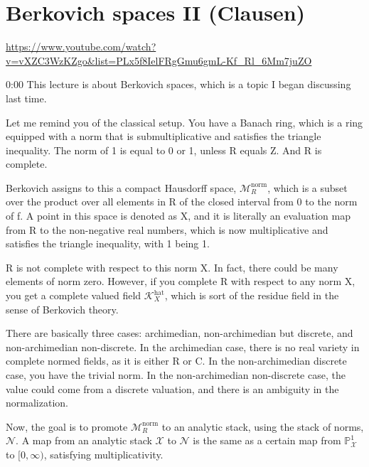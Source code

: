 
\section{\ufs Berkovich spaces II (Clausen)}

\url{https://www.youtube.com/watch?v=vXZC3WzKZgo&list=PLx5f8IelFRgGmu6gmL-Kf_Rl_6Mm7juZO}
\renewcommand{\yt}[2]{\href{https://www.youtube.com/watch?v=vXZC3WzKZgo&list=PLx5f8IelFRgGmu6gmL-Kf_Rl_6Mm7juZO&t=#1}{#2}}
\vspace{1em}

\begin{unfinished}{0:00}
This lecture is about Berkovich spaces, which is a topic I began discussing last time.

Let me remind you of the classical setup. You have a Banach ring, which is a ring equipped with a norm that is submultiplicative and satisfies the triangle inequality. The norm of 1 is equal to 0 or 1, unless R equals Z. And R is complete.

Berkovich assigns to this a compact Hausdorff space, $\mathcal{M}_R^{\text{norm}}$, which is a subset over the product over all elements in R of the closed interval from 0 to the norm of f. A point in this space is denoted as X, and it is literally an evaluation map from R to the non-negative real numbers, which is now multiplicative and satisfies the triangle inequality, with 1 being 1.

R is not complete with respect to this norm X. In fact, there could be many elements of norm zero. However, if you complete R with respect to any norm X, you get a complete valued field $\mathcal{K}_X^{\text{hat}}$, which is sort of the residue field in the sense of Berkovich theory.

There are basically three cases: archimedian, non-archimedian but discrete, and non-archimedian non-discrete. In the archimedian case, there is no real variety in complete normed fields, as it is either R or C. In the non-archimedian discrete case, you have the trivial norm. In the non-archimedian non-discrete case, the value could come from a discrete valuation, and there is an ambiguity in the normalization.

Now, the goal is to promote $\mathcal{M}_R^{\text{norm}}$ to an analytic stack, using the stack of norms, $\mathcal{N}$. A map from an analytic stack $\mathcal{X}$ to $\mathcal{N}$ is the same as a certain map from $\mathbb{P}^1_{\mathcal{X}}$ to $[0, \infty)$, satisfying multiplicativity.


\end{unfinished}
